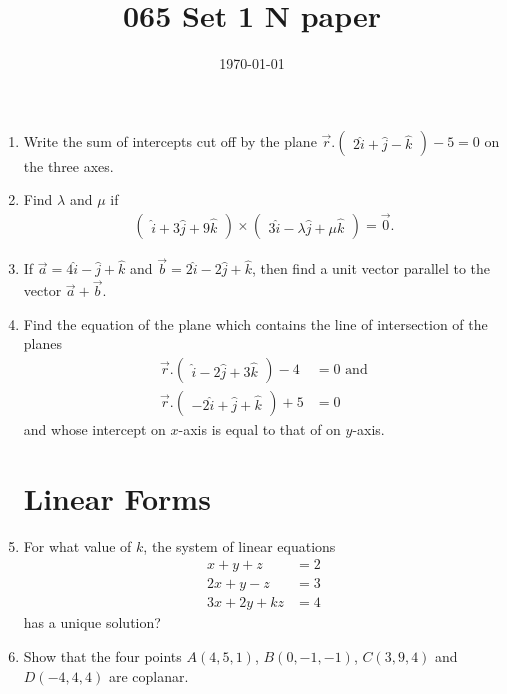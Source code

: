 \documentclass[12pt,-letter paper]{article}
\title{065 Set 1 N paper}
\date{\today}
\newcommand{\myvec}[1]{\ensuremath{\begin{pmatrix}#1\end{pmatrix}}}
\begin{document}

\begin{enumerate}

\section{Vectors}
	\item Write the sum of intercepts cut off by the plane $\overrightarrow{r}.\myvec{2\hat{i}+\hat{j}-\hat{k}} - 5 = 0$ on the three axes.

	\item Find $\lambda$ and $\mu$ if
	\begin{align}
		\myvec{\hat{i} + 3\hat{j} + 9\hat{k}} \times \myvec{3\hat{i} - \lambda \hat{j} + \mu \hat{k}} = \overrightarrow{0}.
	\end{align}

	\item If $\overrightarrow{a} = 4\hat{i} - \hat{j} +\hat{k}$ and $\overrightarrow{b} = 2\hat{i} - 2\hat{j} + \hat{k}$, then find a unit vector parallel to the vector $\overrightarrow{a}+\overrightarrow{b}$.

	\item Find the equation of the plane which contains the line of intersection of the planes
	\begin{align}
		\overrightarrow{r}.\myvec{\hat{i} - 2\hat{j} + 3\hat{k}} - 4 &= 0 \text{  and}\\
		\overrightarrow{r}.\myvec{-2\hat{i} + \hat{j} + \hat{k}} + 5 &= 0
	\end{align}
and whose intercept on $x$-axis is equal to that of on $y$-axis.



\section{Linear Forms}
	\item For what value of $k$, the system of linear equations 
	\begin{align}
		x+y+z &= 2\\
		2x+y-z &=3\\
		3x+2y+kz &=4
	\end{align}
	has a unique solution? 
	
	\item Show that the four points $A(4,5,1)$, $ B(0,-1,-1)$, 
$C(3,9,4)$ and $D(-4,4,4)$ are coplanar.


\end{enumerate}
\end{document}
